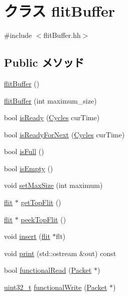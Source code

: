 \hypertarget{classflitBuffer}{
\section{クラス flitBuffer}
\label{classflitBuffer}
}


{\ttfamily \#include $<$flitBuffer.hh$>$}\subsection*{Public メソッド}
\begin{DoxyCompactItemize}
\item 
\hyperlink{classflitBuffer_a2b1bb33c8148b87e9c088503ce752b0a}{flitBuffer} ()
\item 
\hyperlink{classflitBuffer_a2e743ce8c662b9e44db2698126c80a4e}{flitBuffer} (int maximum\_\-size)
\item 
bool \hyperlink{classflitBuffer_ae19b07af91a49435139ba13f5665b239}{isReady} (\hyperlink{classCycles}{Cycles} curTime)
\item 
bool \hyperlink{classflitBuffer_acfec01985f9a32bd6b7d9b86983962b3}{isReadyForNext} (\hyperlink{classCycles}{Cycles} curTime)
\item 
bool \hyperlink{classflitBuffer_a3e70330939fdfc4dbc2f60c1a660584d}{isFull} ()
\item 
bool \hyperlink{classflitBuffer_af337ffd75e4f019ce15302c60715d84b}{isEmpty} ()
\item 
void \hyperlink{classflitBuffer_ac58f3102de0ff8d654c9dbdf86c82b2a}{setMaxSize} (int maximum)
\item 
\hyperlink{classflit}{flit} $\ast$ \hyperlink{classflitBuffer_aef06e3e3a0dc69f7371e17f090dd6758}{getTopFlit} ()
\item 
\hyperlink{classflit}{flit} $\ast$ \hyperlink{classflitBuffer_a9acec5a59084e74a736447b76d614e3f}{peekTopFlit} ()
\item 
void \hyperlink{classflitBuffer_abdd88df99d32b605d0850f09dd90581f}{insert} (\hyperlink{classflit}{flit} $\ast$flt)
\item 
void \hyperlink{classflitBuffer_ac55fe386a101fbae38c716067c9966a0}{print} (std::ostream \&out) const 
\item 
bool \hyperlink{classflitBuffer_a6db56c593ee28a561c47e75a859300dd}{functionalRead} (\hyperlink{classPacket}{Packet} $\ast$)
\item 
\hyperlink{Type_8hh_a435d1572bf3f880d55459d9805097f62}{uint32\_\-t} \hyperlink{classflitBuffer_aba9037f662122b5f2e85647d35670e5c}{functionalWrite} (\hyperlink{classPacket}{Packet} $\ast$)
\end{DoxyCompactItemize}
